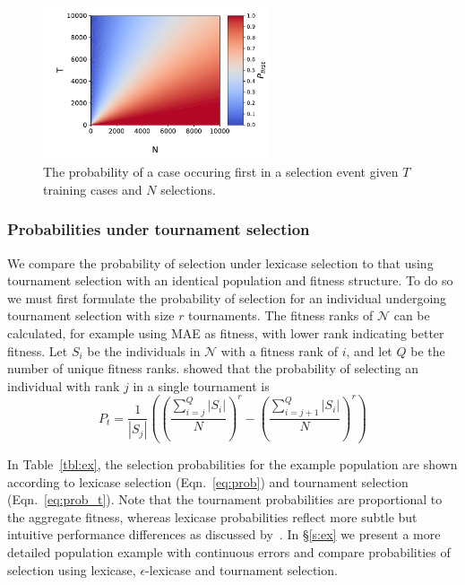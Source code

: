 \documentclass[twoside]{article}
\begin{document}
\begin{figure}
\centering
  \includegraphics[width = 0.6\textwidth]{figs/prob_case_first_heatmap.pdf}
  \caption{The probability of a case occuring first in a selection event given $T$ training cases and $N$ selections.}\label{fig:prob_first}
\end{figure}

\subsubsection{Probabilities under tournament selection} We compare the probability of selection under lexicase selection to that using tournament selection with an identical population and fitness structure. To do so we must first formulate the probability of selection for an individual undergoing tournament selection with size $r$ tournaments. The fitness ranks of $\mathcal{N}$ can be calculated, for example using MAE as fitness, with lower rank indicating better fitness. Let $S_i$ be the individuals in $\mathcal{N}$ with a fitness rank of $i$, and let $Q$ be the number of unique fitness ranks. \cite{xie_another_2007} showed that the probability of selecting an individual with rank $j$ in a single tournament is
\begin{equation}\label{eq:prob_t}
P_t = \frac{1}{|S_j|}\left( \left(\frac{\sum_{i=j}^Q{|S_i|}}{N}\right)^r - \left(\frac{\sum_{i=j+1}^Q{|S_i|}}{N}\right)^r \right)
\end{equation}

In Table~\ref{tbl:ex}, the selection probabilities for the example population are shown according to lexicase selection (Eqn.~\ref{eq:prob}) and tournament selection (Eqn.~\ref{eq:prob_t}). Note that the tournament probabilities are proportional to the aggregate fitness, whereas lexicase probabilities reflect more subtle but intuitive performance differences as discussed by~\cite{spector_assessment_2012}. In \S\ref{s:ex} we present a more detailed population example with continuous errors and compare probabilities of selection using lexicase, $\epsilon$-lexicase and tournament selection. 
\end{document}
